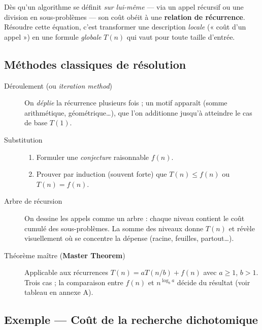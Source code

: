 Dès qu’un algorithme se définit \emph{sur lui-même} — via un appel récursif ou
une division en sous-problèmes — son coût obéit à une \textbf{relation de
récurrence}.  Résoudre cette équation, c’est transformer une description
\emph{locale} (« coût d’un appel ») en une formule \emph{globale}
\(T(n)\) qui vaut pour toute taille d’entrée.

\subsection{Méthodes classiques de résolution}

\begin{description}
  \item[Déroulement (ou \textit{iteration method})]
        On \emph{déplie} la récurrence plusieurs fois ; un motif apparaît
        (somme arithmétique, géométrique…), que l’on additionne jusqu’à
        atteindre le cas de base \(T(1)\).

  \item[Substitution]\phantom{a}

        \begin{enumerate}
         \item Formuler une \emph{conjecture} raisonnable $f(n)$.
         \item Prouver par induction (souvent forte) que $T(n)\le f(n)$ ou
           $T(n)=f(n)$.
        \end{enumerate}


  \item[Arbre de récursion]
        On dessine les appels comme un arbre : chaque niveau contient le coût
        cumulé des sous-problèmes.  La somme des niveaux donne $T(n)$ et
        révèle visuellement où se concentre la dépense (racine, feuilles, partout…).

  \item[Théorème maître (\textbf{Master Theorem})]
        Applicable aux récurrences $T(n)=aT(n/b)+f(n)$ avec $a\ge1$, $b>1$.
        Trois cas ; la comparaison entre $f(n)$ et
        \(n^{\log_b a}\) décide du résultat (voir tableau en annexe A).
\end{description}

\subsection{Exemple — Coût de la recherche dichotomique}

